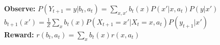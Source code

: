 \textbf{Observe:} $P(Y_{t+1} = y| b_t, a_t) = \sum_{x,x'} b_t(x) P(x'| x, a_t) P(y|x')$\\
$b_{t+1}(x') = \frac{1}{Z} \sum_x b_t(x) P(X_{t+1} = x'| X_t = x, a_t) P(y_{t+1}|x')$\\
\textbf{Reward:} $r(b_t, a_t) = \sum_x b_t(x) r(x,a_t)$\\
\begin{comment}
	The transition model now contains stochastic observations and state updates through bayesian filtering.\\
	It can calculate the optimal action using dynamic programming. Often, the horizon is limited to T, the reachable belief states still grow exponential in T.\\
\end{comment}


